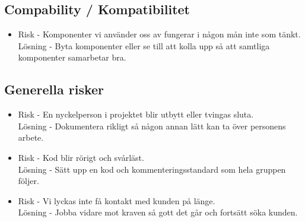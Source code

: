 \subsection{Compability / Kompatibilitet}
\begin{itemize}
\item Risk - Komponenter vi använder oss av fungerar i någon mån inte som tänkt.
\\Lösning - Byta komponenter eller se till att kolla upp så att samtliga komponenter samarbetar bra.
\end{itemize}

\subsection{Generella risker}
\begin{itemize}
\item Risk - En nyckelperson i projektet blir utbytt eller tvingas sluta.
\\Lösning - Dokumentera rikligt så någon annan lätt kan ta över personens arbete.
\item Risk - Kod blir rörigt och svårläst.
\\Lösning - Sätt upp en kod och kommenteringsstandard som hela gruppen följer.
\item Risk - Vi lyckas inte få kontakt med kunden på länge.
\\Lösning - Jobba vidare mot kraven så gott det går och fortsätt söka kunden.
\end{itemize}



